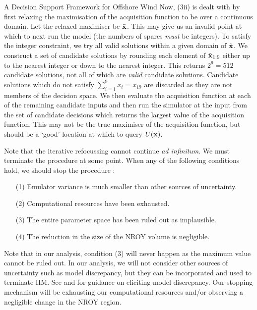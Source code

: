 \begin{chapter}{A Decision Support Framework for Offshore Wind \label{Ch:ds-for-ow}}
Now, (3ii) is dealt with by first relaxing the maximisation of the acquisition function to be over a continuous domain. Let the relaxed maximiser be $\tilde{\mathbf{x}}$. This may give us an invalid point at which to next run the model (the numbers of spares \textit{must} be integers). To satisfy the integer constraint, we try all valid solutions within a given domain of $\tilde{\mathbf{x}}$. We construct a set of candidate solutions by rounding each element of $\tilde{\mathbf{x}}_{1:9}$ either up to the nearest integer or down to the nearest integer. This returns $2^9 = 512$ candidate solutions, not all of which are \textit{valid} candidate solutions. Candidate solutions which do not satisfy $\sum_{i = 1}^9 x_i = x_{19}$ are discarded as they are not members of the decision space. We then evaluate the acquisition function at each of the remaining candidate inputs and then run the simulator at the input from the set of candidate decisions which returns the largest value of the acquisition function. This may not be the true maximiser of the acquisition function, but should be a `good' location at which to query $U(\mathbf{x})$.

Note that the iterative refocussing cannot continue \textit{ad infinitum}. We must terminate the procedure at some point. When any of the following conditions hold, we should stop the procedure \citep{Vernon2010}:
\begin{itemize}
 \item[(1)] Emulator variance is much smaller than other sources of uncertainty.
 \item[(2)] Computational resources have been exhausted.
 \item[(3)] The entire parameter space has been ruled out as implausible.
 \item[(4)] The reduction in the size of the NROY volume is negligible.
\end{itemize}
Note that in our analysis, condition (3) will never happen as the maximum value cannot be ruled out. In our analysis, we will not consider other sources of uncertainty such as model discrepancy, but they can be incorporated and used to terminate HM. See \citet{Ling2014} and \citet{Brynjarsdottir2014} for guidance on eliciting model discrepancy. Our stopping mechanism will be exhausting our computational resources and/or observing a negligible change in the NROY region.


\end{chapter}
